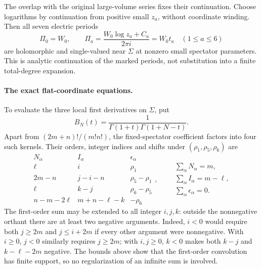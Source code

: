 The overlap with the original large-volume series fixes their
continuation. Choose logarithms by continuation from positive
small $z_a$, without coordinate winding. Then all seven electric
periods
\begin{equation}
 \Pi_0=W_0,\qquad
 \Pi_a=\frac{W_0\log z_a+C_a}{2\pi i}=W_0t_a
 \quad(1\leq a\leq6)
 \label{eq:x9-bulk-electric-periods}
\end{equation}
are holomorphic and single-valued near $\Sigma$ at nonzero small
spectator parameters. This is analytic continuation of the marked
periods, not substitution into a finite total-degree expansion.

\paragraph{The exact flat-coordinate equations.}
To evaluate the three local first derivatives on $\Sigma$, put
\begin{equation}
 B_N(t)=\frac1{\Gamma(1+t)\Gamma(1+N-t)}.
 \label{eq:x9-bulk-binomial-kernel}
\end{equation}
Apart from $(2m+n)!/(m!n!)$, the fixed-spectator coefficient
factors into four such kernels. Their orders, integer indices
and shifts under $(\rho_1,\rho_5,\rho_6)$ are
\begin{equation}
 \begin{array}{c|c|c}
 N_\alpha&I_\alpha&\epsilon_\alpha\\\hline
 \ell&i&\rho_1\\
 2m-n&j-i-n&\rho_5-\rho_1\\
 \ell&k-j&\rho_6-\rho_5\\
 n-m-2\ell&m+n-\ell-k&-\rho_6
 \end{array},\qquad
 \begin{gathered}
 \sum_\alpha N_\alpha=m,\\
 \sum_\alpha I_\alpha=m-\ell,\\
 \sum_\alpha\epsilon_\alpha=0.
 \end{gathered}
 \label{eq:x9-bulk-four-binomial-pairs}
\end{equation}
The first-order sum may be extended to all integer $i,j,k$:
outside the nonnegative orthant there are at least two negative
arguments. Indeed, $i<0$ would require both $j\geq2m$ and
$j\leq i+2m$ if every other argument were nonnegative.
With $i\geq0$, $j<0$ similarly requires $j\geq2m$; with
$i,j\geq0$, $k<0$ makes both $k-j$ and $k-\ell-2m$ negative.
The bounds above show that the first-order convolution has finite
support, so no regularization of an infinite sum is involved.

